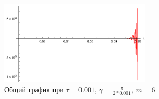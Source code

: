 \begin{figure}[h]
\begin{center}
\includegraphics[width=0.65\textwidth]{./3_results/5_13.eps}
\end{center}
\caption{Общий график при $\tau=0.001$, $\gamma = \frac{\pi}{2*0.001}$, $m=6$}
\end{figure}